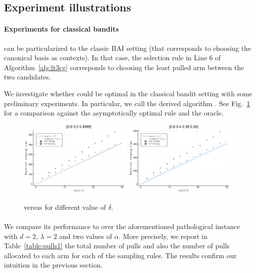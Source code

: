 \subsection{Experiment illustrations}

\paragraph{Experiments for classical bandits} 
\LTCCG can be particularized to the classic BAI setting (that corresponds to choosing the canonical basis as contexts). In that case, the selection rule in Line 6 of Algorithm~\ref{alg:lt3cg} corresponds to choosing the least pulled arm between the two candidates. 

We investigate whether \LTCCG could be optimal in the classical bandit setting with some preliminary experiments. In particular, we call the derived algorithm \TCCG. See Fig.~\ref{fig:convergence} for a comparison against the asymptotically optimal \DT rule and the oracle. 


\begin{figure}[ht]
    \centering
    \includegraphics[width=0.49\textwidth]{Chapter4/img/res1.pdf}
    \includegraphics[width=0.49\textwidth]{Chapter4/img/res2.pdf}
    \caption{\TCCG{} versus \Track{} for different value of $\delta$.}
    \label{fig:convergence}
\end{figure}

\paragraph{\LTCCG}
We compare its performance to \LGapE over the aforementioned pathological instance with $d=2$, $\lambda=2$ and two values of $\alpha$. More precisely, we report in Table~\ref{table:pulls1} the total number of pulls and also the number of pulls allocated to each arm for each of the sampling rules. The results confirm our intuition in the previous section. 

